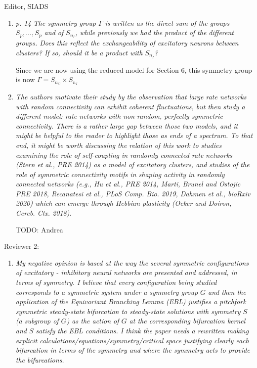 \documentclass[11pt]{letter}
\begin{document}
\begin{letter}{Editor, SIADS}
\begin{enumerate}
\item \emph{p. 14 The symmetry group $\Gamma$ is written as the direct sum of the groups $S_p, \ldots, S_p$ and of $S_{n_I}$, while previously we had the product of the different groups. Does this reflect the exchangeability of excitatory neurons between clusters? If so, should it be a product with $S_{n_I}$? }

\vspace{4mm} 
Since we are now using the reduced model for Section 6, this symmetry group is now $\Gamma = S_{n_C} \times S_{n_I}$


\item \emph{The authors motivate their study by the observation that large rate networks with random connectivity can exhibit coherent fluctuations, but then study a different model: rate networks with non-random, perfectly symmetric connectivity. There is a rather large gap between those two models, and it might be helpful to the reader to highlight those as ends of a spectrum. To that end, it might be worth discussing the relation of this work to studies examining the role of self-coupling in randomly connected rate networks (Stern et al., PRE 2014) as a model of excitatory clusters, and studies of the role of symmetric connectivity motifs in shaping activity in randomly connected networks (e.g., Hu et al., PRE 2014, Marti, Brunel and Ostojic PRE 2018, Recanatesi et al., PLoS Comp. Bio. 2019, Dahmen et al., bioRxiv 2020) which can emerge through Hebbian plasticity (Ocker and Doiron, Cereb. Ctx. 2018). }

\vspace{4mm} 
TODO: Andrea


\end{enumerate}

Reviewer 2:
\begin{enumerate}
\item \emph{My negative opinion is based at the way the several symmetric configurations of excitatory - inhibitory neural networks are presented and addressed, in terms of symmetry. I believe that every configuration being studied corresponds to a symmetric system under a symmetry group $G$ and then the application of the Equivariant Branching Lemma (EBL) justifies a pitchfork symmetric steady-state bifurcation to steady-state solutions with symmetry $S$ (a subgroup of $G$) as the action of $G$ at the corresponding bifurcation kernel and $S$ satisfy the EBL conditions. I think the paper needs a rewritten making explicit calculations/equations/symmetry/critical space justifying clearly each bifurcation in terms of the symmetry and where the symmetry acts to provide the bifurcations.}
\vspace{4mm} 


\end{enumerate}
\end{letter}
\end{document}
